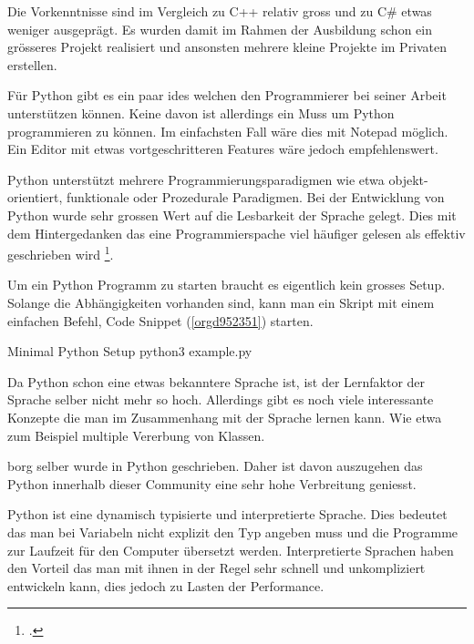 Die Vorkenntnisse sind im Vergleich zu C++ relativ gross und zu C\# etwas
weniger ausgeprägt. Es wurden damit im Rahmen der Ausbildung schon ein
grösseres Projekt realisiert und ansonsten mehrere kleine Projekte im Privaten
erstellen.

Für Python gibt es ein paar \glspl{ide} welchen den Programmierer bei seiner
Arbeit unterstützen können. Keine davon ist allerdings ein Muss um Python
programmieren zu können. Im einfachsten Fall wäre dies mit Notepad möglich. Ein
Editor mit etwas vortgeschritteren Features wäre jedoch empfehlenswert.

Python unterstützt mehrere Programmierungsparadigmen wie etwa
objekt-orientiert, funktionale oder Prozedurale Paradigmen. Bei der Entwicklung
von Python wurde sehr grossen Wert auf die Lesbarkeit der Sprache gelegt. Dies
mit dem Hintergedanken das eine Programmierspache viel häufiger gelesen als
effektiv geschrieben wird \footcite{pep8}.

Um ein Python Programm zu starten braucht es eigentlich kein grosses Setup.
Solange die Abhängigkeiten vorhanden sind, kann man ein Skript mit einem
einfachen Befehl, Code Snippet (\ref{orgd952351}) starten.

\begin{sexylisting}{Minimal Python Setup}
python3 example.py
\end{sexylisting}

Da Python schon eine etwas bekanntere Sprache ist, ist der Lernfaktor der
Sprache selber nicht mehr so hoch. Allerdings gibt es noch viele interessante
Konzepte die man im Zusammenhang mit der Sprache lernen kann. Wie etwa zum
Beispiel multiple Vererbung von Klassen.

\gls{borg} selber wurde in Python geschrieben. Daher ist davon auszugehen das
Python innerhalb dieser Community eine sehr hohe Verbreitung geniesst.

Python ist eine dynamisch typisierte und interpretierte Sprache. Dies bedeutet
das man bei Variabeln nicht explizit den Typ angeben muss und die Programme zur
Laufzeit für den Computer übersetzt werden. Interpretierte Sprachen haben den
Vorteil das man mit ihnen in der Regel sehr schnell und unkompliziert
entwickeln kann, dies jedoch zu Lasten der Performance.

